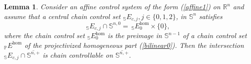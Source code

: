 \documentclass[preprint,12pt]{elsarticle}
\newtheorem{lemma}{Lemma}
\begin{document}
\begin{lemma}
\label{Lemma6.1}Consider an affine control system of the form (\ref{affine1})
on $\mathbb{R}^{n}$ and assume that a central chain control set $_{\mathbb{S}%
}E_{c,j},j\in\{0,1,2\}$, in $\mathbb{S}^{n}$ satisfies%
\begin{equation}
_{\mathbb{S}}E_{c,j}\cap\mathbb{S}^{n,0}=\,_{\mathbb{S}}E_{0}^{\hom}%
\times\{0\}, \label{6.1}%
\end{equation}
where the chain control set $_{\mathbb{S}}E_{0}^{\hom}$ is the preimage in
$\mathbb{S}^{n-1}$ of a chain control set $_{\mathbb{P}}E^{\hom}$ of the
projectivized homogeneous part (\ref{bilinear0}). Then the intersection
$_{\mathbb{S}}E_{c,j}\cap\overline{\mathbb{S}^{n,+}}$ is chain controllable on
$\overline{\mathbb{S}^{n,+}}$.
\end{lemma}
\end{document}
